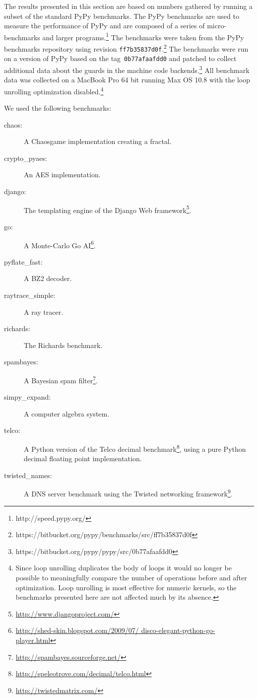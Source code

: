 \documentclass[10pt,preprint]{sigplanconf}
\begin{document}
The results presented in this section are based on numbers gathered by running
a subset of the standard PyPy benchmarks. The PyPy benchmarks are used to
measure the performance of PyPy and are composed of a series of
micro-benchmarks and larger programs.\footnote{http://speed.pypy.org/} The
benchmarks were taken from the PyPy benchmarks repository using revision
\texttt{ff7b35837d0f}.\footnote{https://bitbucket.org/pypy/benchmarks/src/ff7b35837d0f}
The benchmarks were run on a version of PyPy based on the
tag~\texttt{0b77afaafdd0} and patched to collect additional data about the
guards in the machine code
backends.\footnote{https://bitbucket.org/pypy/pypy/src/0b77afaafdd0} All
benchmark data was collected on a MacBook Pro 64 bit running Max OS 10.8 with
the loop unrolling optimization disabled.\footnote{Since loop unrolling
duplicates the body of loops it would no longer be possible to meaningfully
compare the number of operations before and after optimization. Loop unrolling
is most effective for numeric kernels, so the benchmarks presented here are not
affected much by its absence.}

We used the following benchmarks:

\begin{description}
    \item[chaos:] A Chaosgame implementation creating a fractal.
    \item[crypto\_pyaes:] An AES implementation.
    \item[django:] The templating engine of the Django Web
        framework\footnote{\url{http://www.djangoproject.com/}}.

    \item[go:] A Monte-Carlo Go
        AI\footnote{\url{http://shed-skin.blogspot.com/2009/07/ disco-elegant-python-go-player.html}}.
    \item[pyflate\_fast:] A BZ2 decoder.
    \item[raytrace\_simple:] A ray tracer.
    \item[richards:] The Richards benchmark.
    \item[spambayes:] A Bayesian spam filter\footnote{\url{http://spambayes.sourceforge.net/}}.
    \item[simpy\_expand:] A computer algebra system.
    \item[telco:] A Python version of the Telco decimal
        benchmark\footnote{\url{http://speleotrove.com/decimal/telco.html}},
        using a pure Python decimal floating point implementation.
    \item[twisted\_names:] A DNS server benchmark using the Twisted networking
        framework\footnote{\url{http://twistedmatrix.com/}}.
\end{description}
\end{document}
